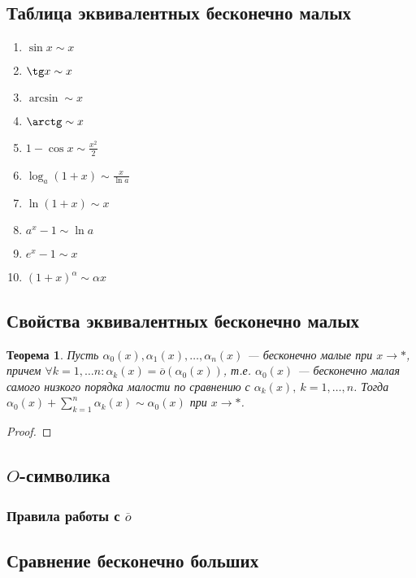 \documentclass[a4paper,12pt]{article} %
\newtheorem{theorem}{Теорема}[section]
\theoremstyle{remark}
\theoremstyle{definition}
\begin{document}
\subsection{Таблица эквивалентных бесконечно малых}
\begin{enumerate}
	\item $\sin x \sim x$
	\item $\tg x \sim x$
	\item $\arcsin \sim x$
	\item $\arctg \sim x$
	\item $1 - \cos x \sim \frac{x^2}{2}$
	\item $\log_a(1+x) \sim \frac{x}{\ln a}$
	\item $\ln(1+x) \sim x$
	\item $a^{x} - 1 \sim \ln a$
	\item $e^{x} - 1 \sim x$
	\item $(1+x)^{\alpha} \sim \alpha x$
\end{enumerate}

\subsection{Свойства эквивалентных бесконечно малых}
\begin{theorem}
	Пусть $\alpha_0(x), \alpha_1(x), \ldots, \alpha_n(x)$ --- бесконечно малые при $x\to *$, причем $\forall k = 1, \ldots n : \alpha_k(x) = \overline{o}(\alpha_0(x))$, т.е. $\alpha_0(x)$ --- бесконечно малая самого низкого порядка малости по сравнению с $\alpha_k(x), \ k = 1, \ldots, n$. Тогда $\alpha_0(x) + \sum_{k=1}^{n} \alpha_k(x) \sim \alpha_0(x)$ при $x\to *$.
\end{theorem}
\begin{proof}
\end{proof}

\subsection{$O$-символика}

\subsubsection*{Правила работы с $\overline{o}$}

\subsection{Сравнение бесконечно больших}
\end{document}
